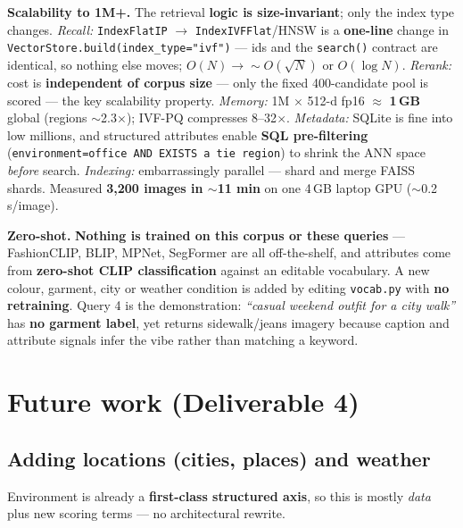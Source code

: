 \documentclass[10pt,a4paper]{article}
\newcommand{\tcode}[1]{\texttt{\small #1}}
\begin{document}
\textbf{Scalability to 1M+.} The retrieval \textbf{logic is size-invariant}; only the index type
changes. \emph{Recall:} \tcode{IndexFlatIP} $\rightarrow$ \tcode{IndexIVFFlat}/HNSW is a
\textbf{one-line} change in \tcode{VectorStore.build(index\_type="ivf")} --- ids and the
\tcode{search()} contract are identical, so nothing else moves; $O(N) \rightarrow \sim O(\sqrt{N})$
or $O(\log N)$. \emph{Rerank:} cost is \textbf{independent of corpus size} --- only the fixed
400-candidate pool is scored --- the key scalability property. \emph{Memory:} 1M $\times$ 512-d fp16
$\approx$ \textbf{1\,GB} global (regions $\sim$2.3$\times$); IVF-PQ compresses 8--32$\times$.
\emph{Metadata:} SQLite is fine into low millions, and structured attributes enable \textbf{SQL
pre-filtering} (\tcode{environment=office AND EXISTS a tie region}) to shrink the ANN space
\emph{before} search. \emph{Indexing:} embarrassingly parallel --- shard and merge FAISS shards.
Measured \textbf{3{,}200 images in $\sim$11 min} on one 4\,GB laptop GPU ($\sim$0.2\,s/image).

\textbf{Zero-shot.} \textbf{Nothing is trained on this corpus or these queries} --- FashionCLIP,
BLIP, MPNet, SegFormer are all off-the-shelf, and attributes come from \textbf{zero-shot CLIP
classification} against an editable vocabulary. A new colour, garment, city or weather condition is
added by editing \tcode{vocab.py} with \textbf{no retraining}. Query 4 is the demonstration:
\emph{``casual weekend outfit for a city walk''} has \textbf{no garment label}, yet returns
sidewalk/jeans imagery because caption and attribute signals infer the vibe rather than matching a
keyword.

\section{Future work \textnormal{\small(Deliverable 4)}}

\subsection{Adding locations (cities, places) and weather}

Environment is already a \textbf{first-class structured axis}, so this is mostly \emph{data} plus
new scoring terms --- no architectural rewrite.
\end{document}
